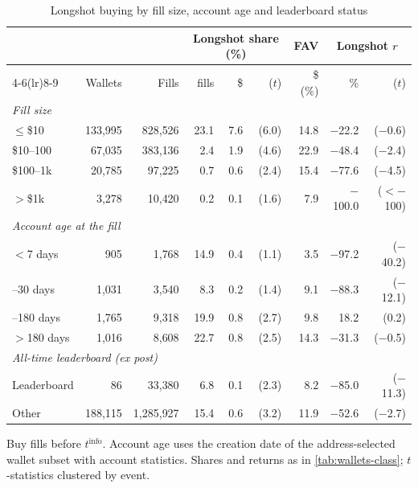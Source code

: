 \begin{table}[t]
\centering
\small
\begin{threeparttable}
\caption{Longshot buying by fill size, account age and leaderboard status}\label{tab:wallets-sizeage}
\begin{tabular}{lrrrrrrrr}
\toprule
& & & \multicolumn{3}{c}{Longshot share (\%)} & FAV & \multicolumn{2}{c}{Longshot $r$} \\
\cmidrule(lr){4-6}\cmidrule(lr){8-9}
& Wallets & Fills & fills & \$ & ($t$) & \$ (\%) & \% & ($t$) \\
\midrule
\multicolumn{9}{l}{\emph{Fill size}} \\
\quad $\leq$\$10 & 133{,}995 & 828{,}526 & 23.1 & 7.6 & (6.0) & 14.8 & $-$22.2 & ($-$0.6) \\
\quad \$10--100 & 67{,}035 & 383{,}136 & 2.4 & 1.9 & (4.6) & 22.9 & $-$48.4 & ($-$2.4) \\
\quad \$100--1k & 20{,}785 & 97{,}225 & 0.7 & 0.6 & (2.4) & 15.4 & $-$77.6 & ($-$4.5) \\
\quad $>$\$1k & 3{,}278 & 10{,}420 & 0.2 & 0.1 & (1.6) & 7.9 & $-$100.0 & ($<-$100) \\
\multicolumn{9}{l}{\emph{Account age at the fill}} \\
\quad $<$7 days & 905 & 1{,}768 & 14.9 & 0.4 & (1.1) & 3.5 & $-$97.2 & ($-$40.2) \\
\quad 7--30 days & 1{,}031 & 3{,}540 & 8.3 & 0.2 & (1.4) & 9.1 & $-$88.3 & ($-$12.1) \\
\quad 30--180 days & 1{,}765 & 9{,}318 & 19.9 & 0.8 & (2.7) & 9.8 & 18.2 & (0.2) \\
\quad $>$180 days & 1{,}016 & 8{,}608 & 22.7 & 0.8 & (2.5) & 14.3 & $-$31.3 & ($-$0.5) \\
\multicolumn{9}{l}{\emph{All-time leaderboard (ex post)}} \\
\quad Leaderboard & 86 & 33{,}380 & 6.8 & 0.1 & (2.3) & 8.2 & $-$85.0 & ($-$11.3) \\
\quad Other & 188{,}115 & 1{,}285{,}927 & 15.4 & 0.6 & (3.2) & 11.9 & $-$52.6 & ($-$2.7) \\
\bottomrule
\end{tabular}
\begin{tablenotes}\footnotesize
\item Buy fills before $t^{\mathrm{info}}$. Account age uses the creation date of the address-selected wallet subset
  with account statistics. Shares and returns as in \cref{tab:wallets-class}; $t$-statistics clustered by event.
\end{tablenotes}
\end{threeparttable}
\end{table}

